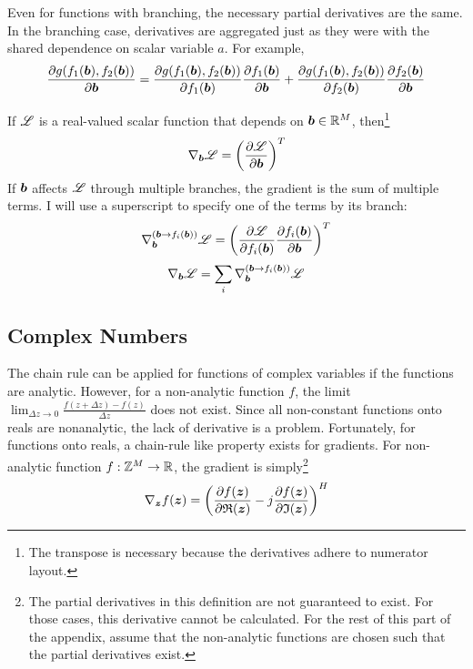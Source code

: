 \begin{appendices}
Even for functions with branching, the necessary partial derivatives are the same. In the branching case, derivatives are aggregated just as they were with the shared dependence on scalar variable $a$. For example,
\begin{equation}
\frac{\partial g(f_1(\bm{b}),f_2(\bm{b}))}{\partial \bm{b}} = \frac{\partial g(f_1(\bm{b}),f_2(\bm{b}))}{\partial f_1(\bm{b})}\frac{\partial f_1(\bm{b})}{\partial \bm{b}} + \frac{\partial g(f_1(\bm{b}),f_2(\bm{b}))}{\partial f_2(\bm{b})}\frac{\partial f_2(\bm{b})}{\partial \bm{b}} 
\end{equation}

If $\mathscr{L}$ is a real-valued scalar function that depends on $\bm{b} \in \mathbb{R}^M$, then\footnote{The transpose is necessary because the derivatives adhere to numerator layout.}
\begin{equation}
\nabla_{\bm{b}} \mathscr{L} = \left(\frac{\partial \mathscr{L}}{\partial \bm{b}}\right)^T
\end{equation}
If $\bm{b}$ affects $\mathscr{L}$ through multiple branches, the gradient is the sum of multiple terms. I will use a superscript to specify one of the terms by its branch:
\begin{equation}
\nabla^{(\bm{b} \rightarrow f_i(\bm{b}))}_{\bm{b}} \mathscr{L} = \left(\frac{\partial \mathscr{L}}{\partial f_i(\bm{b})}\frac{\partial f_i(\bm{b})}{\partial \bm{b}}\right)^T
\end{equation}
\begin{equation}
\nabla_{\bm{b}} \mathscr{L} = \sum_i \nabla^{(\bm{b} \rightarrow f_i(\bm{b}))}_{\bm{b}} \mathscr{L}
\end{equation}

\subsection{Complex Numbers}
The chain rule can be applied for functions of complex variables if the functions are analytic. However, for a non-analytic function $f$, the limit $\lim_{\Delta z \rightarrow 0} \frac{f(z + \Delta z) - f(z)}{\Delta z}$ does not exist. Since all non-constant functions onto reals are nonanalytic, the lack of derivative is a problem. Fortunately, for functions onto reals, a chain-rule like property exists for gradients. For non-analytic function $f: \mathbb{Z}^M \rightarrow \mathbb{R}$, the gradient is simply\footnote{The partial derivatives in this definition are not guaranteed to exist. For those cases, this derivative cannot be calculated. For the rest of this part of the appendix, assume that the non-analytic functions are chosen such that the partial derivatives exist.}
\begin{equation} \label{equation:Gradient Definition}
\nabla_{\bm{z}} f(\bm{z}) = \left(\frac{\partial f(\bm{z})}{\partial \mathfrak{R}(\bm{z})} - j\frac{\partial f(\bm{z})}{\partial \mathfrak{I}(\bm{z})}\right)^H
\end{equation}


\end{appendices}
